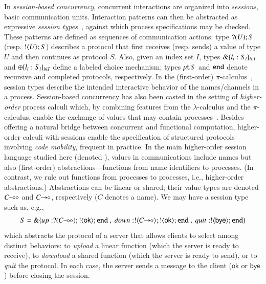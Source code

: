 In \emph{session-based concurrency}, concurrent interactions are organized into \emph{sessions}, basic communication units.
Interaction patterns can then be abstracted as expressive \emph{session types}~\cite{honda.vasconcelos.kubo:language-primitives}, against which process specifications may be checked. 
These patterns are defined as %
sequences of communication actions: %
type $? (U) ; S$ (resp.  $! \langle U \rangle ; S$)
describes a protocol that first receives (resp. sends) a value of type $U$ and then continues as protocol $S$.
Also, given an index set $I$, types $\& \{l_i:S_i\}_{i \in I}$ 
and $\oplus \{l_i:S_i\}_{i \in I}$ 
define %
 a labeled choice mechanism; types 
$\mu\mathsf{t}.S$ 
and 
$\mathtt{end}$ denote recursive and completed protocols, respectively.
In the (first-order) $\pi$-calculus~\cite{MilnerR:calmp1}, 
session types describe the intended interactive behavior of the names/channels in a process.
Session-based concurrency has also been casted in the setting of \emph{higher-order} process
calculi which, by combining features from the $\lambda$-calculus and the $\pi$-calculus, 
enable the exchange of values that may contain processes~\cite{tlca07,DBLP:journals/jfp/GayV10}. 
Besides offering a natural bridge between concurrent and functional computation, 
higher-order calculi with sessions enable the specification of structured protocols involving \emph{code mobility}, 
frequent in practice.
In the main higher-order session language  studied here (denoted \HOp),
 values in communications include names but also (first-order) abstractions---functions from name identifiers to processes. 
 (In contrast, we rule out functions from processes to processes, i.e., higher-order abstractions.)
Abstractions can be linear or shared; their value types are  denoted $C\!\! \multimap\!\! \diamond$ and $C\!\! \rightarrow\!\! \diamond$, respectively ($C$ 
denotes a name). We may have a 
session type such as, e.g.,
$$S = \btbra{up:\btinp{\lhot{C}}\btout{\mathsf{ok}}\tinact ~ , ~ down:\btout{\shot{C}}\btout{\mathsf{ok}}\tinact ~ , ~quit:\btout{\mathsf{bye}}\tinact}_{}$$
which abstracts the protocol of a server that allows 
  clients to select among distinct  behaviors: %
  to \emph{upload} a linear function (which the server is ready to receive), to \emph{download} a shared function (which the server is ready to send), or to \emph{quit} the protocol.
  In each case, the server sends a message to the client ($\mathsf{ok}$ or $\mathsf{bye}$) before closing the session.




